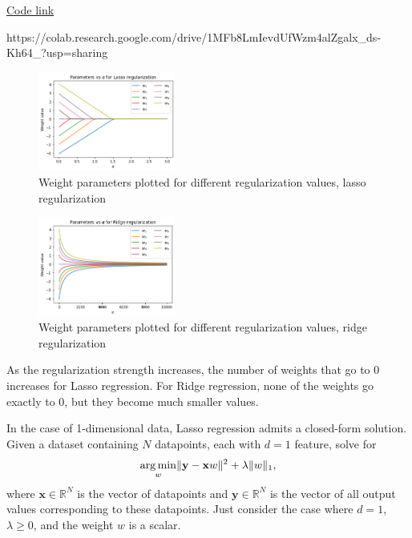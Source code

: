 \begin{solution}
  \href{https://colab.research.google.com/drive/1MFb8LmIevdUfWzm4alZgalx_ds-Kh64_?usp=sharing}{Code link}

  https://colab.research.google.com/drive/1MFb8LmIevdUfWzm4alZgalx_ds-Kh64_?usp=sharing

  \begin{figure}[H]
    \centering
    \includegraphics[width=0.4\textwidth]{images/3a_1.png}
    \caption{Weight parameters plotted for different regularization values, lasso regularization}
    \label{fig:3a_1}
  \end{figure}

  \begin{figure}[H]
    \centering
    \includegraphics[width=0.4\textwidth]{images/3a_2.png}
    \caption{Weight parameters plotted for different regularization values, ridge regularization}
    \label{fig:3a_2}
  \end{figure}

  As the regularization strength increases, the number of weights that go to 0 increases for Lasso regression. For Ridge regression, none of the weights go exactly to 0, but they become much smaller values.
\end{solution}

\problem[9]

\subproblem
In the case of 1-dimensional data, Lasso regression admits a closed-form solution.
Given a dataset containing $N$ datapoints, each with $d = 1$ feature, solve for
\[\underset{w}{\operatorname{arg\,min}} \Vert\mathbf{y} - \mathbf{x}w\Vert^2 + \lambda\Vert w\Vert_1,
\]
where $\mathbf{x} \in \mathbb{R}^{N}$ is the vector of datapoints and $\mathbf{y} \in \mathbb{R}^N$ is the  vector of all output values corresponding to these datapoints. Just consider the case where $d = 1$, $\lambda \geq 0$, and the weight $w$ is a scalar.

